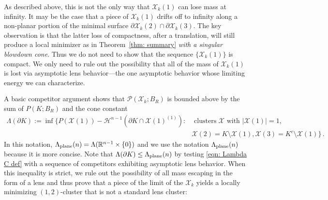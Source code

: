\documentclass[10pt,reqno]{amsart}
\numberwithin{equation}{section}
\theoremstyle{definition}
\newcommand{\X}{\mathcal{X}}
\begin{document}
{As described above, this} is not the only way that $\X_k(1)$ can lose mass at infinity. It may be the case that a piece of $\X_k(1)$ drifts off to infinity along a non-planar portion of the minimal surface $\partial \X_k(2) \cap \partial \X_k(3)$. %
The key observation is that the latter loss of compactness, after a translation, will 
 still produce a local minimizer as in Theorem~\ref{thm: summary} {\it with a singular blowdown cone}. Thus we do not need to show that the sequence $\{\X_k({1})\}$ is compact. We only need to rule out the possibility that all of the mass of $\X_k(1)$ is lost via asymptotic lens behavior---the one asymptotic behavior whose limiting energy we can characterize. 
\medskip

A basic competitor argument shows that $\mathcal{P}(\X_k;B_R)$ is bounded above by the sum of $P(K; B_R)$ and the cone constant
\begin{equation}
    \label{eqn: Lambda C def}
    \begin{split}
    \Lambda(\partial K) :=\inf \{P(\X(1)) - \mathcal{H}^{n-1}({\partial K} \cap \X(1)^{(1)}) :& \text{ clusters $\X$ with }|\X(1)|=1, \\ 
    &  \X(2) = K \setminus \X(1), \X(3) = K^c\setminus \X(1) \}\,.
    \end{split}
\end{equation}
In this notation, $\Lambda_{\rm plane}(n) = \Lambda(\mathbb{R}^{n-1}\times \{0\})$ and we use the notation $\Lambda_{\rm plane}(n)$ because it is more concise. Note that $\Lambda(\partial K) \leq \Lambda_{\rm plane}(n)$ by testing \eqref{eqn: Lambda C def} with a sequence of competitors exhibiting asymptotic lens behavior. When this inequality is strict, we {rule out the possibility of all mass escaping in the form of a lens and thus} prove that a piece of the limit of the $\X_k$ yields a locally minimizing $(1,2)$-cluster that is not a standard lens cluster:
\end{document}
